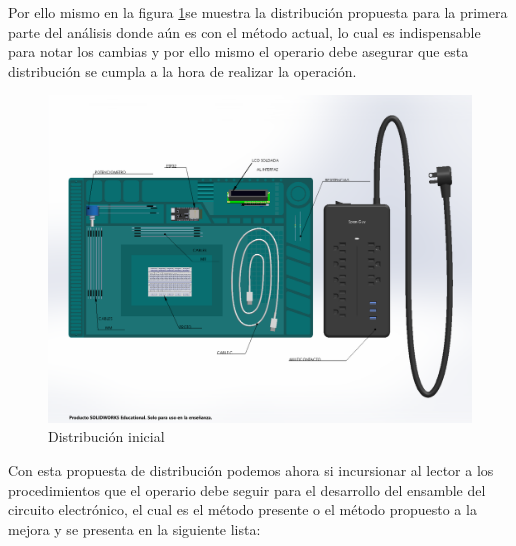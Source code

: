     Por ello mismo en la figura \ref{fig:Distribucion inicial}se muestra la distribución propuesta para la primera parte del análisis donde aún es con el método actual, lo cual es indispensable para notar los cambias y por ello mismo el operario debe asegurar que esta distribución se cumpla a la hora de realizar la operación.
        \begin{figure}[H] 
        \centering
        \includegraphics[trim = {1mm 1mm 1mm 1mm},clip,scale=0.3]{22/Img/ensamblaje.pdf}
        \caption{Distribución inicial}
        \label{fig:Distribucion inicial}
    \end{figure}
    
    Con esta propuesta de distribución podemos ahora si incursionar al lector a los procedimientos que el operario debe seguir para el desarrollo del ensamble del circuito electrónico, el cual es el método presente o el método propuesto a la mejora y se presenta en la siguiente lista:
    

